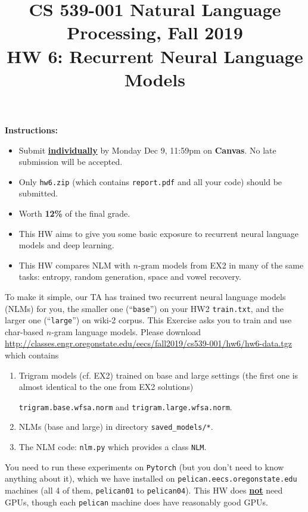 \documentclass{article}
\title{\vspace{-1cm}CS 539-001 Natural Language Processing, Fall 2019\\HW 6: Recurrent Neural Language Models}
\date{\vspace{-1.5cm}}
\begin{document}
\maketitle

{\bf Instructions:}
\begin{itemize}
\item Submit \underline{\bf individually} by Monday Dec 9, 11:59pm on {\bf Canvas}. No late submission will be accepted. 
\item Only {\tt hw6.zip} (which contains {\tt report.pdf} and all your code) should be submitted.
\item Worth {\bf 12\%} of the final grade.
\item This HW aims to give you some basic exposure to recurrent neural language models and deep learning.
\item This HW compares NLM with $n$-gram models from EX2 in many of the same tasks: entropy, random generation, space and vowel recovery.
\end{itemize}

\smallskip

To make it simple, our TA has trained two recurrent neural language models (NLMs) for you, the smaller one (``\verb|base|'') on your HW2 \verb|train.txt|,
and the larger one (``\verb|large|'') on wiki-2 corpus. 
This Exercise asks you to train and use char-based $n$-gram language models. 
Please download \url{http://classes.engr.oregonstate.edu/eecs/fall2019/cs539-001/hw6/hw6-data.tgz} which contains

\begin{enumerate}
\item Trigram models (cf. EX2) trained on base and large settings (the first one is almost identical to the one from EX2 solutions)

\verb|trigram.base.wfsa.norm| and \verb|trigram.large.wfsa.norm|.
\item NLMs (base and large) in directory \verb|saved_models/*|.
\item The NLM code: \verb|nlm.py| which provides a class \verb|NLM|.

\end{enumerate}

You need to run these experiments on \verb|Pytorch| (but you don't need to know anything about it), which we have installed
on \verb|pelican.eecs.oregonstate.edu| machines (all 4 of them, \verb|pelican01| to \verb|pelican04|). This HW does \underline{\bf not} need GPUs, though each \verb|pelican| machine does have reasonably good GPUs.
\end{document}
